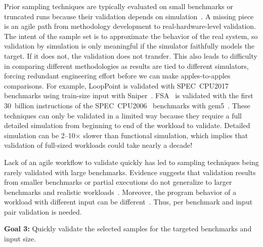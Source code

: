 Prior sampling techniques are typically evaluated on small benchmarks or truncated runs because their validation depends on simulation~\cite{wavelet-based,taskpoint,simpoint,looppoint,smarts,fsa,cross_binary_simpoints,pacsim,barrier_point,simpoint-plus,parrot}.
A missing piece is an agile path from methodology development to real-hardware-level validation. 
The intent of the sample set is to approximate the behavior of the real system, so validation by simulation is only meaningful if the simulator faithfully models the target. 
If it does not, the validation does not transfer.
This also leads to difficulty in comparing different methodologies as results are tied to different simulators, forcing redundant engineering effort before we can make apples-to-apples comparisons.
For example, LoopPoint is validated with SPEC~CPU2017 benchmarks using train-size input with Sniper~\cite{sniper}.  
FSA~\cite{fsa} is validated with the first 30~billion instructions of the SPEC~CPU2006~\cite{spec2006} benchmarks with gem5~\cite{11_gem5,20_gem5}.
These techniques can only be validated in a limited way because they require a full detailed simulation from beginning to end of the workload to validate.
Detailed simulation can be 2--10$\times$ slower than functional simulation, which implies that validation of full-sized workloads could take nearly a decade! 

Lack of an agile workflow to validate quickly has led to sampling techniques being rarely validated with large benchmarks.
Evidence suggests that validation results from smaller benchmarks or partial executions do not generalize to larger benchmarks and realistic workloads~\cite{characterizing_and_comparing_prevailing_simulation_techniques,hot-region-spec2017,simpoint,spec2017-workload-characterization,wavelet-based}.
Moreover, the program behavior of a workload with different input can be different~\cite{xalancbmk}.
Thus, per benchmark and input pair validation is needed.

\begin{tcolorbox}
\textbf{Goal 3:}
Quickly validate the selected samples for the targeted benchmarks and input size.
\end{tcolorbox}
